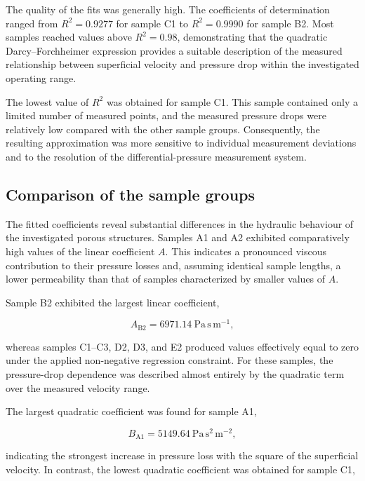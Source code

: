 \documentclass[a4paper]{article}
\begin{document}
The quality of the fits was generally high. The coefficients of determination ranged from \(R^2=0.9277\) for sample C1 to \(R^2=0.9990\) for sample B2. Most samples reached values above \(R^2=0.98\), demonstrating that the quadratic Darcy--Forchheimer expression provides a suitable description of the measured relationship between superficial velocity and pressure drop within the investigated operating range.

The lowest value of \(R^2\) was obtained for sample C1. This sample contained only a limited number of measured points, and the measured pressure drops were relatively low compared with the other sample groups. Consequently, the resulting approximation was more sensitive to individual measurement deviations and to the resolution of the differential-pressure measurement system.

\subsection{Comparison of the sample groups}
\label{subsec:comparison_sample_groups}

The fitted coefficients reveal substantial differences in the hydraulic behaviour of the investigated porous structures. Samples A1 and A2 exhibited comparatively high values of the linear coefficient \(A\). This indicates a pronounced viscous contribution to their pressure losses and, assuming identical sample lengths, a lower permeability than that of samples characterized by smaller values of \(A\).

Sample B2 exhibited the largest linear coefficient,

\begin{equation}
    A_{\mathrm{B2}}
    =
    6971.14~\mathrm{Pa\,s\,m^{-1}},
\end{equation}

whereas samples C1--C3, D2, D3, and E2 produced values effectively equal to zero under the applied non-negative regression constraint. For these samples, the pressure-drop dependence was described almost entirely by the quadratic term over the measured velocity range.

The largest quadratic coefficient was found for sample A1,

\begin{equation}
    B_{\mathrm{A1}}
    =
    5149.64~\mathrm{Pa\,s^2\,m^{-2}},
\end{equation}

indicating the strongest increase in pressure loss with the square of the superficial velocity. In contrast, the lowest quadratic coefficient was obtained for sample C1,
\end{document}
